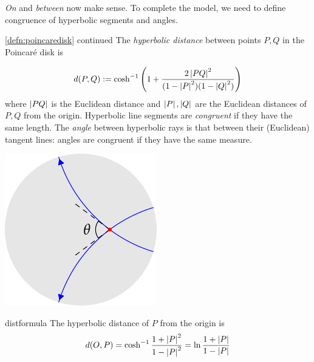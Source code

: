 \emph{On} and \emph{between} now make sense. To complete the model, we need to define congruence of hyperbolic segments and angles.

\begin{defn*}{\ref{defn:poincaredisk} continued}
The \emph{hyperbolic distance} between points $P,Q$ in the Poincaré disk is

\begin{minipage}[t]{0.7\linewidth}\vspace{-12pt}
	\[d(P,Q):=\cosh^{-1}\left(1+\frac{2\left| PQ\right|^2}{(1-\left| P\right|^2)(1-\left| Q\right|^2)}\right)\]
	where $\left| PQ\right|$ is the Euclidean distance and $\left| P\right|,\left| Q\right|$ are the Euclidean distances of $P,Q$ from the origin.\smallbreak
	Hyperbolic line segments are \emph{congruent} if they have the same length.\smallbreak
	The \emph{angle} between hyperbolic rays is that between their (Euclidean) tangent lines: angles are congruent if they have the same measure.
	\end{minipage}\begin{minipage}[t]{0.3\linewidth}\vspace{-5pt}
	\flushright\includegraphics{models-angle}
	\end{minipage}
\end{defn*}

\begin{lemm}{}{distformula}
The hyperbolic distance\footnotemark{} of $P$ from the origin is
\[d(O,P)=\cosh^{-1}\frac{1+\left| P\right|^2}{1-\left| P\right|^2}=\ln\frac{1+\left| P\right|}{1-\left| P\right|}\]
\end{lemm}



